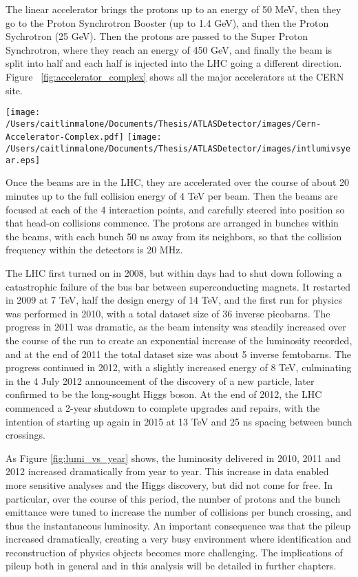 The linear accelerator brings the protons up to an energy of 50 MeV, then they go to the Proton Synchrotron Booster (up to 1.4 GeV), and then the Proton Sychrotron (25 GeV).  Then the protons are passed to the Super Proton Synchrotron, where they reach an energy of 450 GeV, and finally the beam is split into half and each half is injected into the LHC going a different direction.  Figure ~\ref{fig:accelerator_complex} shows all the major accelerators at the CERN site.

\texttt{[image: /Users/caitlinmalone/Documents/Thesis/ATLASDetector/images/Cern-Accelerator-Complex.pdf]}\label{fig:accelerator_complex}
\texttt{[image: /Users/caitlinmalone/Documents/Thesis/ATLASDetector/images/intlumivsyear.eps]}\label{fig:lumi_vs_year}


Once the beams are in the LHC, they are accelerated over the course of about 20 minutes up to the full collision energy of 4 TeV per beam.  Then the beams are focused at each of the 4 interaction points, and carefully steered into position so that head-on collisions commence.  The protons are arranged in bunches within the beams, with each bunch 50 ns away from its neighbors, so that the collision frequency within the detectors is 20 MHz.  

The LHC first turned on in 2008, but within days had to shut down following a catastrophic failure of the bus bar between superconducting magnets.  It restarted in 2009 at 7 TeV, half the design energy of 14 TeV, and the first run for physics was performed in 2010, with a total dataset size of 36 inverse picobarns.  The progress in 2011 was dramatic, as the beam intensity was steadily increased over the course of the run to create an exponential increase of the luminosity recorded, and at the end of 2011 the total dataset size was about 5 inverse femtobarns.  The progress continued in 2012, with a slightly increased energy of 8 TeV, culminating in the 4 July 2012 announcement of the discovery of a new particle, later confirmed to be the long-sought Higgs boson.  At the end of 2012, the LHC commenced a 2-year shutdown to complete upgrades and repairs, with the intention of starting up again in 2015 at 13 TeV and 25 ns spacing between bunch crossings.

As Figure \ref{fig:lumi_vs_year} shows, the luminosity delivered in 2010, 2011 and 2012 increased dramatically from year to year.  This increase in data enabled more sensitive analyses and the Higgs discovery, but did not come for free.  In particular, over the course of this period, the number of protons and the bunch emittance were tuned to increase the number of collisions per bunch crossing, and thus the instantaneous luminosity.  An important consequence was that the pileup increased dramatically, creating a very busy environment where identification and reconstruction of physics objects becomes more challenging.  The implications of pileup both in general and in this analysis will be detailed in further chapters.



